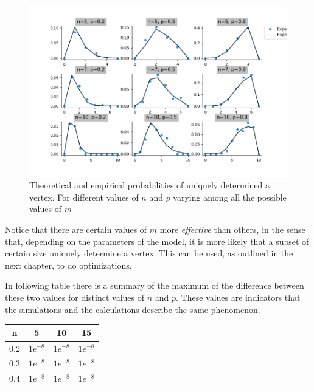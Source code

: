 \clearpage
\begin{figure}[h!]
	\centering
	\includegraphics[scale=0.55]{Python/Figures/Uniquely-determinated-fixed-vertex.png}
	\caption{Theoretical and empirical probabilities of uniquely determined a vertex. For different values of $n$ and $p$ varying among all the possible values of $m$}
\end{figure}

Notice that there are certain values of $m$ more \textit{effective} than others, in the sense that, depending on the parameters of the model, it is more likely that a subset of certain size uniquely determine a vertex. This can be used, as outlined in the next chapter, to do optimizations.
 
In following table there is a summary of the maximum of the difference between these two values for distinct values of $n$ and $p$. These values are indicators that the simulations and the calculations describe the same phenomenon.

\bgroup
\def\arraystretch{1.5}%
\begin{center}
\begin{tabular}{|c|c|c|c|}
\hline
n & 5 & 10 & 15 \\
\hline \hline
 0.2 & $1e^{-8}$ & $1e^{-8}$ & $1e^{-8}$ \\\hline
 0.3 & $1e^{-8}$ & $1e^{-8}$ & $1e^{-8}$ \\\hline
 0.4 & $1e^{-8}$ & $1e^{-8}$ & $1e^{-8}$ \\\hline
\end{tabular}
\caption{Maximums of differences between empirical and theoretical probabilities varying $m$ for different values of $n$ and $p$}
\label{tabla:sencilla}
\end{center}
\bgroup

